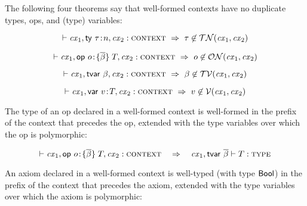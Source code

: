 The following four theorems say that well-formed contexts have no duplicate
types, ops, and (type) variables:

\begin{theorem}\label{thm-cx-uniq-typ}
\[
\vdash\mathit{cx}_1,\mathsf{ty}\ \tau\!:\!n,\mathit{cx}_2:\textsc{context}\ \Rightarrow\ \tau\not\in\mathcal{TN}(\mathit{cx}_1,\mathit{cx}_2)
\]
\end{theorem}

\begin{theorem}\label{thm-cx-uniq-op}
\[
\vdash\mathit{cx}_1,\mathsf{op}\ o\!:\!\{\overline{\beta}\}\;T,\mathit{cx}_2:\textsc{context}\ \Rightarrow\ o\not\in\mathcal{ON}(\mathit{cx}_1,\mathit{cx}_2)
\]
\end{theorem}

\begin{theorem}\label{thm-cx-uniq-tvar}
\[
\vdash\mathit{cx}_1,\mathsf{tvar}\ \beta,\mathit{cx}_2:\textsc{context}\ \Rightarrow\ \beta\not\in\mathcal{TV}(\mathit{cx}_1,\mathit{cx}_2)
\]
\end{theorem}

\begin{theorem}\label{thm-cx-uniq-var}
\[
\vdash\mathit{cx}_1,\mathsf{var}\ v\!:\!T,\mathit{cx}_2:\textsc{context}\ \Rightarrow\ v\not\in\mathcal{V}(\mathit{cx}_1,\mathit{cx}_2)
\]
\end{theorem}

The type of an op declared in a well-formed context is well-formed in the
prefix of the context that precedes the op, extended with the type variables
over which the op is polymorphic:

\begin{theorem}\label{thm-op-type-wf}
\[
\cxwf{\cx_1,\odecO,\cx_2}\ \ \IMPLIES\ \ 
\isty{\snoc{\cx_1}{\tvdec{\tvarS}}}{\typ}
\]
\end{theorem}



An axiom declared in a well-formed context is well-typed (with type $\mathsf{Bool}$)
in the prefix of the context that precedes the axiom, extended with the type
variables over which the axiom is polymorphic:

